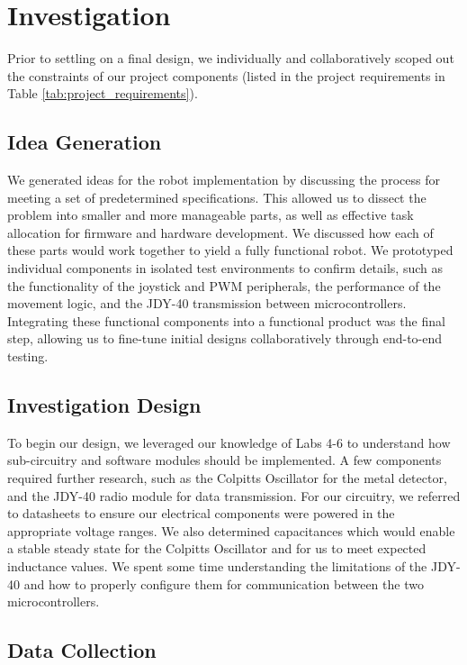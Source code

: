 \documentclass{article}
\begin{document}
\section{Investigation}

Prior to settling on a final design, we individually and collaboratively scoped out the
constraints of our project components (listed in the project requirements in Table \ref{tab:project_requirements}).

\subsection{Idea Generation}

We generated ideas for the robot implementation by discussing the process for meeting a set of predetermined specifications.
This allowed us to dissect the problem into smaller and more manageable parts, as well as effective task allocation for firmware and
hardware development. We discussed how each of these parts would work together to yield a fully functional robot. We prototyped individual components
in isolated test environments to confirm details, such as the functionality of the joystick and PWM peripherals, the performance of the movement logic,
and the JDY-40 transmission between microcontrollers. Integrating these functional components into a functional product was the
final step, allowing us to fine-tune initial designs collaboratively through end-to-end testing.

\subsection{Investigation Design}

To begin our design, we leveraged our knowledge of Labs 4-6 to understand how sub-circuitry and software modules should be implemented.
A few components required further research, such as the Colpitts Oscillator for the metal detector, and the JDY-40 radio module for data transmission. %
For our circuitry, we referred to datasheets to ensure our electrical components were powered in the appropriate voltage ranges.
We also determined capacitances which would enable a stable steady state for the Colpitts Oscillator and for us to meet expected inductance values.
We spent some time understanding the limitations of the JDY-40 and how to properly configure them for communication between the two microcontrollers.

\subsection{Data Collection}
\end{document}
